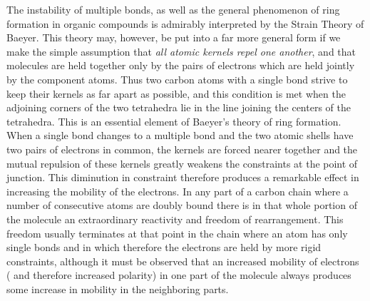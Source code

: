\documentclass[11pt]{memoir}
\begin{document}
The instability of multiple bonds, as well as the general phenomenon of ring formation in organic compounds is admirably interpreted by the Strain Theory of Baeyer.  This theory may, however, be put into a far more general form if we make the simple assumption that \emph{all atomic kernels repel one another}, and that molecules are held together only by the pairs of electrons which are held jointly by the component atoms.  Thus two carbon atoms with a single bond strive to keep their kernels as far apart as possible, and this condition is met when the adjoining corners of the two tetrahedra lie in the line joining the centers of the tetrahedra.  This is an essential element of Baeyer's theory of ring formation.  When a single bond changes to a multiple bond and the two atomic shells have two pairs of electrons in common, the kernels are forced nearer together and the mutual repulsion of these kernels greatly weakens the constraints at the point of junction.  This diminution in constraint therefore produces a remarkable effect in increasing the mobility of the electrons.  In any part of a carbon chain where a number of consecutive atoms are doubly bound there is in that whole portion of the molecule an extraordinary reactivity and freedom of rearrangement.  This freedom usually terminates at that point in the chain where an atom has only single bonds and in which therefore the electrons are held by more rigid constraints, although it must be observed that an increased mobility of electrons ( and therefore increased polarity) in one part of the molecule always produces some increase in mobility in the neighboring parts.
\end{document}
